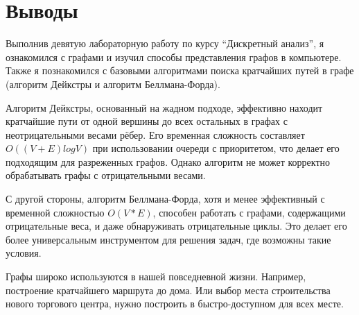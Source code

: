 \section{Выводы}

Выполнив девятую лабораторную работу по курсу \enquote{Дискретный анализ}, 
я ознакомился с графами и изучил способы представления графов в компьютере. Также я познакомился с 
базовыми алгоритмами поиска кратчайших путей в графе (алгоритм Дейкстры и алгоритм Беллмана-Форда).

Алгоритм Дейкстры, основанный на жадном подходе, эффективно находит кратчайшие пути от одной вершины до всех 
остальных в графах с неотрицательными весами рёбер. Его временная сложность составляет $O((V + E) log V)$ при 
использовании очереди с приоритетом, что делает его подходящим для разреженных графов. 
Однако алгоритм не может корректно обрабатывать графы с отрицательными весами.

С другой стороны, алгоритм Беллмана-Форда, хотя и менее эффективный с временной сложностью $O(V * E)$, 
способен работать с графами, содержащими отрицательные веса, и даже обнаруживать отрицательные циклы. 
Это делает его более универсальным инструментом для решения задач, где возможны такие условия.

Графы широко используются в нашей повседневной жизни. Например, построение кратчайшего маршрута до дома.
Или выбор места строительства нового торгового центра, нужно построить в быстро-доступном для всех месте.

\pagebreak